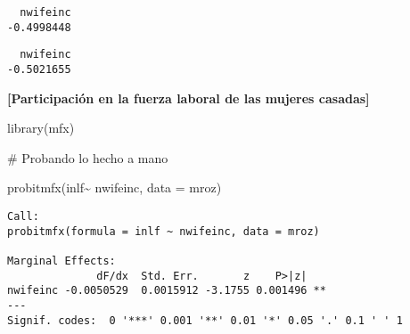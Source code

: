 \documentclass[
  letterpaper,
  DIV=11,
  numbers=noendperiod]{scrreprt}
\newenvironment{Shaded}{\begin{snugshade}}{\end{snugshade}}
\newcommand{\AttributeTok}[1]{\textcolor[rgb]{0.40,0.45,0.13}{#1}}
\newcommand{\CommentTok}[1]{\textcolor[rgb]{0.37,0.37,0.37}{#1}}
\newcommand{\DecValTok}[1]{\textcolor[rgb]{0.68,0.00,0.00}{#1}}
\newcommand{\FunctionTok}[1]{\textcolor[rgb]{0.28,0.35,0.67}{#1}}
\newcommand{\NormalTok}[1]{\textcolor[rgb]{0.00,0.23,0.31}{#1}}
\newcommand{\OtherTok}[1]{\textcolor[rgb]{0.00,0.23,0.31}{#1}}
\newcommand{\SpecialCharTok}[1]{\textcolor[rgb]{0.37,0.37,0.37}{#1}}
\begin{document}
\begin{verbatim}
  nwifeinc 
-0.4998448 
\end{verbatim}

\begin{Shaded}
\end{Shaded}

\begin{verbatim}
  nwifeinc 
-0.5021655 
\end{verbatim}

\textbf{{[}Participación en la fuerza laboral de las mujeres casadas{]}}

\begin{Shaded}
\begin{Highlighting}[]
\FunctionTok{library}\NormalTok{(mfx)}

\CommentTok{\# Probando lo hecho a mano}

\FunctionTok{probitmfx}\NormalTok{(inlf}\SpecialCharTok{\textasciitilde{}}
\NormalTok{            nwifeinc,}
          \AttributeTok{data =}\NormalTok{ mroz)}
\end{Highlighting}
\end{Shaded}

\begin{verbatim}
Call:
probitmfx(formula = inlf ~ nwifeinc, data = mroz)

Marginal Effects:
              dF/dx  Std. Err.       z    P>|z|   
nwifeinc -0.0050529  0.0015912 -3.1755 0.001496 **
---
Signif. codes:  0 '***' 0.001 '**' 0.01 '*' 0.05 '.' 0.1 ' ' 1
\end{verbatim}

\begin{Shaded}
\end{Shaded}
\end{document}
